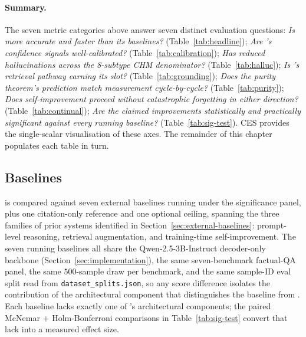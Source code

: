 \paragraph{Summary.}
The seven metric categories above answer seven distinct evaluation questions: \emph{Is \caem{} more accurate and faster than its baselines?} (Table~\ref{tab:headline}); \emph{Are \caem{}'s confidence signals well-calibrated?} (Table~\ref{tab:calibration}); \emph{Has \caem{} reduced hallucinations across the 8-subtype CHM denominator?} (Table~\ref{tab:halluc}); \emph{Is \caem{}'s retrieval pathway earning its slot?} (Table~\ref{tab:grounding}); \emph{Does the purity theorem's prediction match measurement cycle-by-cycle?} (Table~\ref{tab:purity}); \emph{Does self-improvement proceed without catastrophic forgetting in either direction?} (Table~\ref{tab:continual}); \emph{Are the claimed improvements statistically and practically significant against every running baseline?} (Table~\ref{tab:sig-test}). CES provides the single-scalar visualisation of these axes. The remainder of this chapter populates each table in turn.

\subsection{Baselines}
\label{sec:baselines}

\caem{} is compared against seven external baselines running under the significance panel, plus one citation-only reference and one optional ceiling, spanning the three families of prior systems identified in Section~\ref{sec:external-baselines}: prompt-level reasoning, retrieval augmentation, and training-time self-improvement. The seven running baselines all share the Qwen-2.5-3B-Instruct decoder-only backbone (Section~\ref{sec:implementation}), the same seven-benchmark factual-QA panel, the same $500$-sample draw per benchmark, and the same sample-ID eval split read from \texttt{dataset\_splits.json}, so any score difference isolates the contribution of the architectural component that distinguishes the baseline from \caem{}. Each baseline lacks exactly one of \caem{}'s architectural components; the paired McNemar + Holm-Bonferroni comparisons in Table~\ref{tab:sig-test} convert that lack into a measured effect size.

